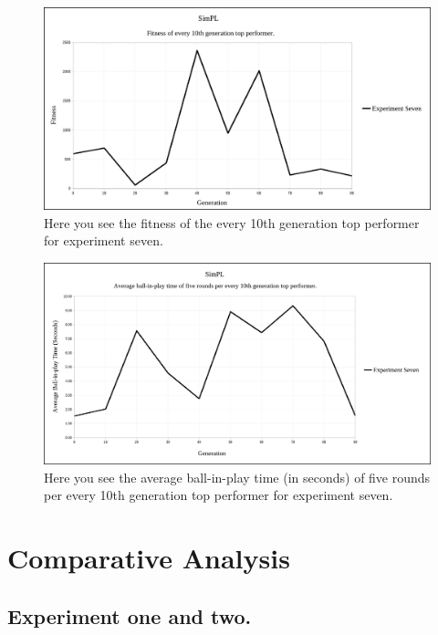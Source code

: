 \documentclass[a4paper,10pt]{article}
\begin{document}
\begin{figure}[H]  
  \centering
  \includegraphics[width=1\textwidth]{figures/exp7_10_tops.png}
  \caption{Here you see the fitness of the every 10th generation top performer for experiment seven.}
  \label{fig:exp7_10_tops}
\end{figure}

\begin{figure}[H]  
  \centering
  \includegraphics[width=1\textwidth]{figures/exp7_10_tops_times.png}
  \caption{Here you see the average ball-in-play time (in seconds) of five rounds per every 10th generation top performer for experiment seven.}
  \label{fig:exp7_10_tops_times}
\end{figure}

\section{Comparative Analysis}

\subsection{Experiment one and two.}
\end{document}
